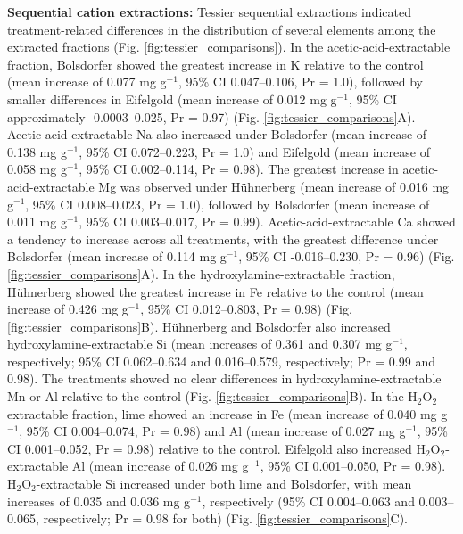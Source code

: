 \documentclass[preprint,12pt]{elsarticle}
\begin{document}
\textbf{Sequential cation extractions:}
  Tessier sequential extractions indicated treatment-related differences in the distribution of several elements among the extracted fractions (Fig. \ref{fig:tessier_comparisons}). In the acetic-acid-extractable fraction, Bolsdorfer showed the greatest increase in K relative to the control (mean increase of 0.077 mg g\(^{-1}\), 95\% CI 0.047–0.106, Pr = 1.0), followed by smaller differences in Eifelgold (mean increase of 0.012 mg g\(^{-1}\), 95\% CI approximately -0.0003–0.025, Pr = 0.97) (Fig. \ref{fig:tessier_comparisons}A). Acetic-acid-extractable Na also increased under Bolsdorfer (mean increase of 0.138 mg g\(^{-1}\), 95\% CI 0.072–0.223, Pr = 1.0) and Eifelgold (mean increase of 0.058 mg g\(^{-1}\), 95\% CI 0.002–0.114, Pr = 0.98). The greatest increase in acetic-acid-extractable Mg was observed under Hühnerberg (mean increase of 0.016 mg g\(^{-1}\), 95\% CI 0.008–0.023, Pr = 1.0), followed by Bolsdorfer (mean increase of 0.011 mg g\(^{-1}\), 95\% CI 0.003–0.017, Pr = 0.99). Acetic-acid-extractable Ca showed a tendency to increase across all treatments, with the greatest difference under Bolsdorfer (mean increase of 0.114 mg g\(^{-1}\), 95\% CI -0.016–0.230, Pr = 0.96) (Fig. \ref{fig:tessier_comparisons}A).
  In the hydroxylamine-extractable fraction, Hühnerberg showed the greatest increase in Fe relative to the control (mean increase of 0.426 mg g\(^{-1}\), 95\% CI 0.012–0.803, Pr = 0.98) (Fig. \ref{fig:tessier_comparisons}B). Hühnerberg and Bolsdorfer also increased hydroxylamine-extractable Si (mean increases of 0.361 and 0.307 mg g\(^{-1}\), respectively; 95\% CI 0.062–0.634 and 0.016–0.579, respectively; Pr = 0.99 and 0.98). The treatments showed no clear differences in hydroxylamine-extractable Mn or Al relative to the control (Fig. \ref{fig:tessier_comparisons}B).
  In the H$_2$O$_2$-extractable fraction, lime showed an increase in Fe (mean increase of 0.040 mg g\(^{-1}\), 95\% CI 0.004–0.074, Pr = 0.98) and Al (mean increase of 0.027 mg g\(^{-1}\), 95\% CI 0.001–0.052, Pr = 0.98) relative to the control. Eifelgold also increased H$_2$O$_2$-extractable Al (mean increase of 0.026 mg g\(^{-1}\), 95\% CI 0.001–0.050, Pr = 0.98). H$_2$O$_2$-extractable Si increased under both lime and Bolsdorfer, with mean increases of 0.035 and 0.036 mg g\(^{-1}\), respectively (95\% CI 0.004–0.063 and 0.003–0.065, respectively; Pr = 0.98 for both) (Fig. \ref{fig:tessier_comparisons}C).
\end{document}

